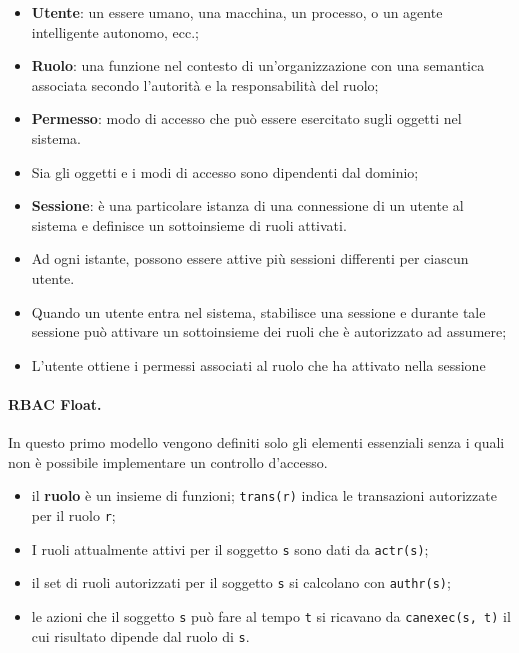 \begin{itemize}
    \item \textbf{Utente}: un essere umano, una macchina, un processo, o un
          agente intelligente autonomo, ecc.;
    \item \textbf{Ruolo}: una funzione nel contesto di un'organizzazione con
          una semantica associata
          secondo l'autorità e la responsabilità del ruolo;
    \item \textbf{Permesso}: modo di accesso che può essere esercitato sugli
          oggetti nel sistema.
    \item Sia gli oggetti e i modi di accesso sono dipendenti dal dominio;
    \item \textbf{Sessione}: è una particolare istanza di una connessione di
          un utente al sistema e definisce
          un sottoinsieme di ruoli attivati.
    \item Ad ogni istante, possono essere attive più sessioni differenti per
          ciascun utente.
    \item Quando un utente entra nel sistema, stabilisce una sessione e durante
          tale sessione può
          attivare un sottoinsieme dei ruoli che è autorizzato ad assumere;
    \item L'utente ottiene i permessi associati al ruolo che ha attivato nella
          sessione
\end{itemize}

\paragraph{RBAC Float.}

In questo primo modello vengono definiti solo gli elementi essenziali senza i
quali non è possibile implementare un controllo d'accesso.

\begin{itemize}
    \item il \textbf{ruolo} è un insieme di funzioni; \verb|trans(r)|
          indica le transazioni autorizzate per il ruolo \verb|r|;
    \item I ruoli attualmente attivi per il soggetto \verb|s| sono dati da
          \verb|actr(s)|;
    \item il set di ruoli autorizzati per il soggetto \verb|s| si calcolano
          con \verb|authr(s)|;
    \item le azioni che il soggetto \verb|s| può fare al tempo \verb|t| si
          ricavano da \verb|canexec(s, t)| il cui risultato
          dipende dal ruolo di \verb|s|.
\end{itemize}

